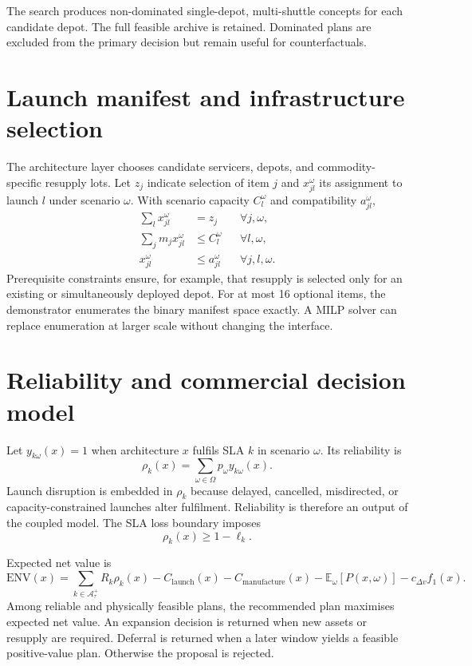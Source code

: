 \documentclass[review,12pt,authoryear]{elsarticle}
\newcommand{\E}{\mathbb{E}}
\newcommand{\dv}{\Delta v}
\newcommand{\scenset}{\Omega}
\begin{document}
The search produces non-dominated single-depot, multi-shuttle concepts for each
candidate depot. The full feasible archive is retained. Dominated plans are
excluded from the primary decision but remain useful for counterfactuals.

\section{Launch manifest and infrastructure selection}
\label{sec:manifest}

The architecture layer chooses candidate servicers, depots, and
commodity-specific resupply lots. Let $z_j$ indicate selection of item $j$ and
$x_{jl}^{\omega}$ its assignment to launch $l$ under scenario $\omega$. With
scenario capacity $C_l^\omega$ and compatibility $a_{jl}^\omega$,
\begin{align}
 \sum_lx_{jl}^\omega&=z_j &&\forall j,\omega,\\
 \sum_jm_jx_{jl}^\omega&\le C_l^\omega &&\forall l,\omega,\\
 x_{jl}^\omega&\le a_{jl}^\omega &&\forall j,l,\omega.
\end{align}
Prerequisite constraints ensure, for example, that resupply is selected only
for an existing or simultaneously deployed depot. For at most 16 optional
items, the demonstrator enumerates the binary manifest space exactly. A MILP
solver can replace enumeration at larger scale without changing the interface.

\section{Reliability and commercial decision model}
\label{sec:decision}

Let $y_{k\omega}(x)=1$ when architecture $x$ fulfils SLA $k$ in scenario
$\omega$. Its reliability is
\begin{equation}
 \rho_k(x)=\sum_{\omega\in\scenset}p_\omega y_{k\omega}(x).
\end{equation}
Launch disruption is embedded in $\rho_k$ because delayed, cancelled,
misdirected, or capacity-constrained launches alter fulfilment. Reliability is
therefore an output of the coupled model. The SLA loss boundary imposes
\begin{equation}
 \rho_k(x)\ge 1-\ell_k.
\end{equation}

Expected net value is
\begin{equation}
 \mathrm{ENV}(x)=
 \sum_{k\in\mathcal{A}_\tau^+}R_k\rho_k(x)
 -C_{\mathrm{launch}}(x)-C_{\mathrm{manufacture}}(x)
 -\E_\omega[P(x,\omega)]-c_{\dv}f_1(x).
\end{equation}
Among reliable and physically feasible plans, the recommended plan maximises
expected net value. An expansion decision is returned when new assets or
resupply are required. Deferral is returned when a later window yields a
feasible positive-value plan. Otherwise the proposal is rejected.
\end{document}
